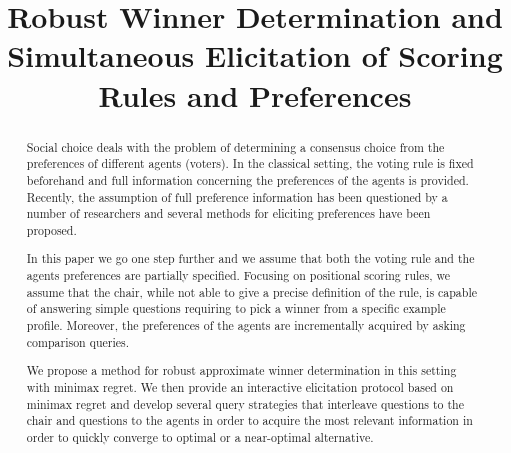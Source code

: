 \newrelation{\pinc}{\!\parallel\!}%

\newcommand{\profile}{\bm{v}}%
\newcommand{\pprofile}{{\bm{p}}}%
\newcommand{\w}{\bm{w}}
\newcommand{\W}{\mathcal{W}}
\newcommand{\Co}{\mathcal{C}}
\newcommand{\pw}{W}%
\newcommand{\powersetz}[1]{\mathscr{P}^*(#1)}
\newcommand{\strat}[1]{\emph{#1}}

\DeclareMathOperator{\Regret}{Regret}
\DeclareMathOperator{\SCORE}{Score}
\DeclareMathOperator{\PMR}{PMR}
\DeclareMathOperator{\MR}{MR}
\DeclareMathOperator{\MMR}{MMR}
\DeclareMathOperator*{\argmax}{argmax}
\DeclareMathOperator*{\argmin}{argmin}

\newtheorem{claim}{Claim}
\newtheorem{prop}{Proposition}
\newtheorem{corollary}{Corollary}
\newtheorem{definition}{Definition}
\newtheorem{example}{Example}

\DeclarePairedDelimiter\set{\{}{\}}
\DeclarePairedDelimiter\card{\lvert}{\rvert}
\DeclarePairedDelimiter\abs{\lvert}{\rvert}


\title{Robust Winner Determination and Simultaneous Elicitation of Scoring Rules and Preferences}


\maketitle
\begin{abstract}
Social choice deals with the problem of determining a consensus choice from the preferences of different agents (voters).
In the classical setting, the voting rule is fixed beforehand and full information concerning the preferences of the agents is provided.
Recently, the assumption of full preference information has been questioned by a number of researchers and several methods for eliciting preferences have been proposed.

In this paper we go one step further and we assume that both the voting rule and the agents preferences are partially specified.
Focusing on positional scoring rules, we assume that the chair, while  not able to give a precise definition of the rule, is capable of answering simple questions  requiring to pick a winner from a specific  example profile.
Moreover, the preferences of the agents are incrementally acquired by asking comparison queries.

We propose a method  for robust approximate winner determination in this setting with minimax regret. 
We then provide an interactive elicitation protocol based on minimax regret
and develop several query strategies that interleave questions to the chair and questions to the agents in order to acquire the most relevant information in order to quickly converge to optimal or a near-optimal alternative.
\end{abstract}

